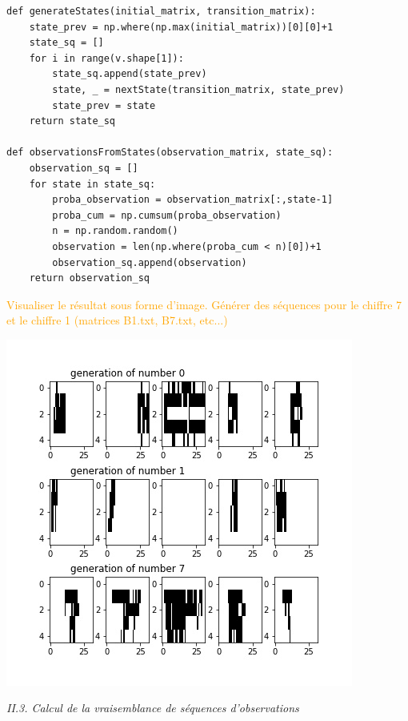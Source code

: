 \documentclass[11pt,a4paper,fleqn]{article}
\begin{document}
\lstset{language=Python}
\lstset{frame=lines}
\lstset{basicstyle=\footnotesize}
\begin{lstlisting}
def generateStates(initial_matrix, transition_matrix):
    state_prev = np.where(np.max(initial_matrix))[0][0]+1
    state_sq = []
    for i in range(v.shape[1]):
        state_sq.append(state_prev)
        state, _ = nextState(transition_matrix, state_prev)
        state_prev = state
    return state_sq

def observationsFromStates(observation_matrix, state_sq):
    observation_sq = []
    for state in state_sq:
        proba_observation = observation_matrix[:,state-1]
        proba_cum = np.cumsum(proba_observation)
        n = np.random.random()
        observation = len(np.where(proba_cum < n)[0])+1
        observation_sq.append(observation)
    return observation_sq
\end{lstlisting}

\vspace{5mm}
\textcolor{orange}{Visualiser le résultat sous forme d’image. Générer des séquences pour le chiffre 7 et le
chiffre 1 (matrices B1.txt, B7.txt, etc...)}

\begin{center}
\includegraphics[scale = 0.5]{number_generation.jpg}
\end{center}

\vspace{5mm}
\textit{II.3. Calcul de la vraisemblance de séquences d’observations}
\end{document}
